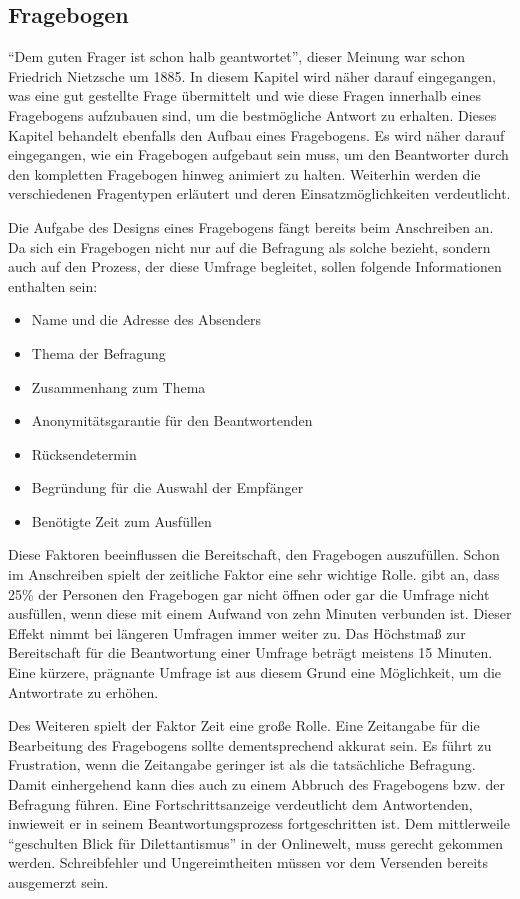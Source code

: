 \subsection{Fragebogen}
\label{acqusition}
\enquote{Dem guten Frager ist schon halb geantwortet}, dieser Meinung war schon Friedrich Nietzsche um 1885.\autocite{Nietzsche}
In diesem Kapitel wird näher darauf eingegangen, was eine gut gestellte Frage übermittelt und wie diese Fragen innerhalb eines Fragebogens aufzubauen sind, um die bestmögliche Antwort zu erhalten.
Dieses Kapitel behandelt ebenfalls den Aufbau eines Fragebogens.
Es wird näher darauf eingegangen, wie ein Fragebogen aufgebaut sein muss, um den Beantworter durch den kompletten Fragebogen hinweg animiert zu halten.
Weiterhin werden die verschiedenen Fragentypen erläutert und deren Einsatzmöglichkeiten verdeutlicht.

Die Aufgabe des Designs eines Fragebogens fängt bereits beim Anschreiben an.
Da sich ein Fragebogen nicht nur auf die Befragung als solche bezieht, sondern auch auf den Prozess, der diese Umfrage begleitet, sollen folgende Informationen enthalten sein:\autocite[Vgl.][S. 29]{2003Fragebogen} %
%
\begin{itemize}
	\item Name und die Adresse des Absenders
	\item Thema der Befragung
	\item Zusammenhang zum Thema
	\item Anonymitätsgarantie für den Beantwortenden
	\item Rücksendetermin
	\item Begründung für die Auswahl der Empfänger
	\item Benötigte Zeit zum Ausfüllen
\end{itemize}
%
Diese Faktoren beeinflussen die Bereitschaft, den Fragebogen auszufüllen.
Schon im Anschreiben spielt der zeitliche Faktor eine sehr wichtige Rolle.
\citeauthor{NFP} gibt an, dass 25\% der Personen den Fragebogen gar nicht öffnen oder gar die Umfrage nicht ausfüllen, wenn diese mit einem Aufwand von zehn Minuten verbunden ist.
Dieser Effekt nimmt bei längeren Umfragen immer weiter zu.\autocite[Vgl.][S. 353]{NFP}
Das Höchstmaß zur Bereitschaft für die Beantwortung einer Umfrage beträgt meistens 15 Minuten.\autocite[Vgl.][S. 37]{2009Fragebogen}%
Eine kürzere, prägnante Umfrage ist aus diesem Grund eine Möglichkeit, um die Antwortrate zu erhöhen.

Des Weiteren spielt der Faktor Zeit eine große Rolle.
Eine Zeitangabe für die Bearbeitung des Fragebogens sollte dementsprechend akkurat sein.
Es führt zu Frustration, wenn die Zeitangabe geringer ist als die tatsächliche Befragung.
Damit einhergehend kann dies auch zu einem Abbruch des Fragebogens bzw. der Befragung führen.
Eine Fortschrittsanzeige verdeutlicht dem Antwortenden, inwieweit er in seinem Beantwortungsprozess fortgeschritten ist.
Dem mittlerweile \enquote{geschulten Blick für Dilettantismus} in der Onlinewelt, muss gerecht gekommen werden.
Schreibfehler und Ungereimtheiten müssen vor dem Versenden bereits ausgemerzt sein.\autocite[Siehe][S. 37]{2009Fragebogen} %

